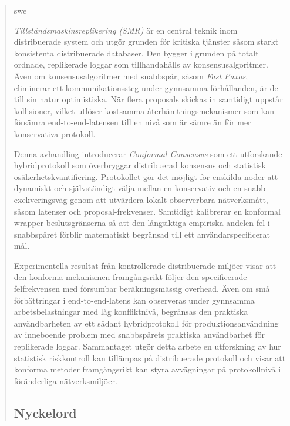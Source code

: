 \documentclass[english,bibtex]{kththesis}
\numberwithin{algorithm}{chapter}
\begin{document}
\cleardoublepage


\begin{abstract}
    \markboth{\abstractname}{}

    \begin{scontents}[store-env=lang]
        swe
    \end{scontents}

    \begin{scontents}[store-env=abstracts,print-env=true]
        \textit{Tillståndsmaskinsreplikering (SMR)} är en central teknik inom distribuerade system och utgör grunden för kritiska tjänster såsom starkt konsistenta distribuerade databaser. Den bygger i grunden på totalt ordnade, replikerade loggar som tillhandahålls av konsensusalgoritmer. Även om konsensusalgoritmer med snabbspår, såsom \textit{Fast Paxos}, eliminerar ett kommunikationssteg under gynnsamma förhållanden, är de till sin natur optimistiska. När flera proposals skickas in samtidigt uppstår kollisioner, vilket utlöser kostsamma återhämtningsmekanismer som kan försämra end-to-end-latensen till en nivå som är sämre än för mer konservativa protokoll.

        Denna avhandling introducerar \textit{Conformal Consensus} som ett utforskande hybridprotokoll som överbryggar distribuerad konsensus och statistisk osäkerhetskvantifiering. Protokollet gör det möjligt för enskilda noder att dynamiskt och självständigt välja mellan en konservativ och en snabb exekveringsväg genom att utvärdera lokalt observerbara nätverksmått, såsom latenser och proposal-frekvenser. Samtidigt kalibrerar en konformal wrapper beslutsgränserna så att den långsiktiga empiriska andelen fel i snabbspåret förblir matematiskt begränsad till ett användarspecificerat mål.

        Experimentella resultat från kontrollerade distribuerade miljöer visar att den konforma mekanismen framgångsrikt följer den specificerade felfrekvensen med försumbar beräkningsmässig overhead. Även om små förbättringar i end-to-end-latens kan observeras under gynnsamma arbetsbelastningar med låg konfliktnivå, begränsas den praktiska användbarheten av ett sådant hybridprotokoll för produktionsanvändning av inneboende problem med snabbspårets praktiska användbarhet för replikerade loggar. Sammantaget utgör detta arbete en utforskning av hur statistisk riskkontroll kan tillämpas på distribuerade protokoll och visar att konforma metoder framgångsrikt kan styra avvägningar på protokollnivå i föränderliga nätverksmiljöer.
    \end{scontents}

    \subsection*{Nyckelord}

    \begin{scontents}[store-env=keywords,print-env=true]
    \end{scontents}
\end{abstract}
\end{document}
